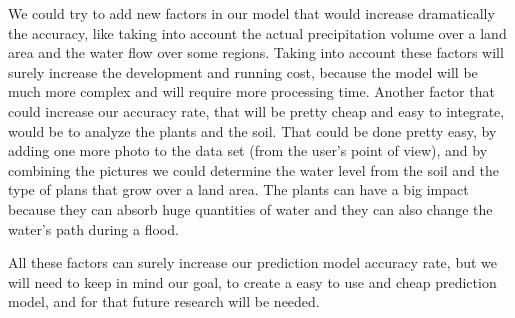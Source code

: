 \documentclass[12pt, a4paper]{report}
\begin{document}
We could try to add new factors in our model that would increase dramatically the accuracy, like taking into account the actual precipitation volume over a land area and the water flow over some regions. Taking into account these factors will surely increase the development and running cost, because the model will be much more complex and will require more processing time. Another factor that could increase our accuracy rate, that will be pretty cheap and easy to integrate, would be to analyze the plants and the soil. That could be done pretty easy, by adding one more photo to the data set (from the user's point of view), and by combining the pictures we could determine the water level from the soil and the type of plans that grow over a land area. The plants can have a big impact because they can absorb huge quantities of water and they can also change the water's path during a flood.
\par 
All these factors can surely increase our prediction model accuracy rate, but we will need to keep in mind our goal, to create a easy to use and cheap prediction model, and for that future research will be needed.




\renewcommand{\bibname}{Bibliography}

\end{document}
